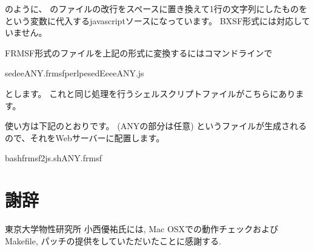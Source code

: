 \documentclass[letterpaper,10pt,dvipdfmx,openany]{sphinxmanual}
\begin{document}
\sphinxAtStartPar
のように、 {\hyperref[\detokenize{input:input}]{}} のファイルの改行をスペースに置き換えて1行の文字列にしたものを
 という変数に代入するjavascriptソースになっています。
BXSF形式には対応していません。

\sphinxAtStartPar
FRMSF形式のファイルを上記の形式に変換するにはコマンドラインで

\begin{sphinxVerbatim}[commandchars=\\\{\}]
sed\PYGZhy{}e\PYGZhy{}eANY.frmsfperl\PYGZhy{}pesed\PYGZhy{}E\PYGZhy{}e\PYGZhy{}e\PYGZhy{}e\PYGZgt{}ANY.js
\end{sphinxVerbatim}

\sphinxAtStartPar
とします。
これと同じ処理を行うシェルスクリプトファイルがこちらにあります。

\sphinxAtStartPar
{}

\sphinxAtStartPar
使い方は下記のとおりです。  (ANYの部分は任意) というファイルが生成されるので、それをWebサーバーに配置します。

\begin{sphinxVerbatim}[commandchars=\\\{\}]
\PYGZdl{}bashfrmsf2js.shANY.frmsf
\end{sphinxVerbatim}

\sphinxstepscope


\chapter{謝辞}
\label{\detokenize{ack:id1}}\label{\detokenize{ack::doc}}
\sphinxAtStartPar
東京大学物性研究所 小西優祐氏には, Mac
OSXでの動作チェックおよびMakefile,
パッチの提供をしていただいたことに感謝する.

\sphinxstepscope
\end{document}

